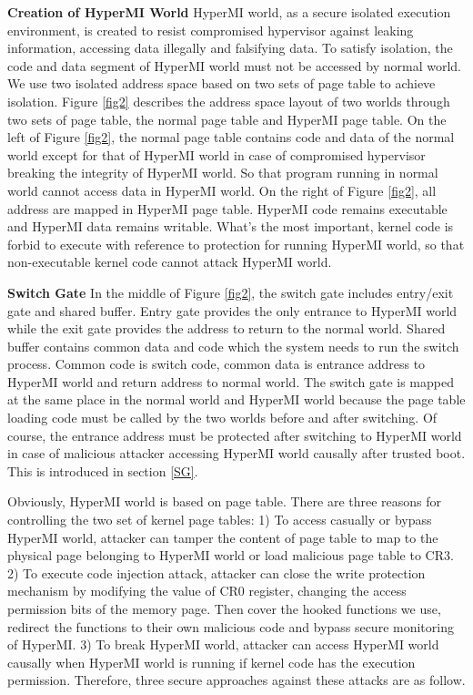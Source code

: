 \documentclass[conference]{IEEEtran}
\begin{document}
\textbf{Creation of HyperMI World}
HyperMI world, as a secure isolated execution environment, is created to resist compromised hypervisor against leaking information, accessing data illegally and falsifying data.
To satisfy isolation, the code and data segment of HyperMI world must not be accessed by normal world. We use two isolated address space based on two sets of page table to achieve isolation.
Figure \ref{fig2} describes the address space layout of two worlds through two sets of page table, the normal page table and HyperMI page table. On the left of Figure \ref{fig2}, the normal page table contains code and data of the normal world except for that of HyperMI world in case of compromised hypervisor breaking the integrity of HyperMI world. So that program running in normal world cannot access data in HyperMI world. On the right of Figure \ref{fig2}, all address are mapped in HyperMI page table.
HyperMI code remains executable and HyperMI data remains writable. What's the most important, kernel code is forbid to execute with reference to protection for running HyperMI world, so that non-executable kernel code  cannot attack HyperMI world.

\textbf{Switch Gate}
In the middle of Figure \ref{fig2}, the switch gate includes entry/exit gate and shared buffer. Entry gate provides the only entrance to HyperMI world while the exit gate provides the address to return to the normal world. Shared buffer contains common data and code which the system needs to run the switch process. Common code is switch code, common data is entrance address to HyperMI world and return address to normal world. The switch gate is mapped at the same place in the normal world and HyperMI world because the page table loading code must be called by the two worlds before and after switching. Of course, the entrance address must be protected after switching to HyperMI world in case of malicious attacker accessing HyperMI world causally after trusted boot. This is introduced in section \ref{SG}.

\iffalse

Obviously, HyperMI world is based on page table. There are three reasons for controlling the two set of kernel page tables: 1) To access casually or bypass HyperMI world, attacker can tamper the content of page table to map to the physical page belonging to HyperMI world or load malicious page table to CR3. 2) To execute code injection attack, attacker can close the write protection mechanism by modifying the value of CR0 register, changing the access permission bits of the memory page. Then cover the hooked functions we use, redirect the functions to their own malicious code and bypass secure monitoring of HyperMI. 3) To break HyperMI world, attacker can access HyperMI world causally when HyperMI world is running if kernel code has the execution permission. Therefore, three secure approaches against these attacks are as follow.
\end{document}

